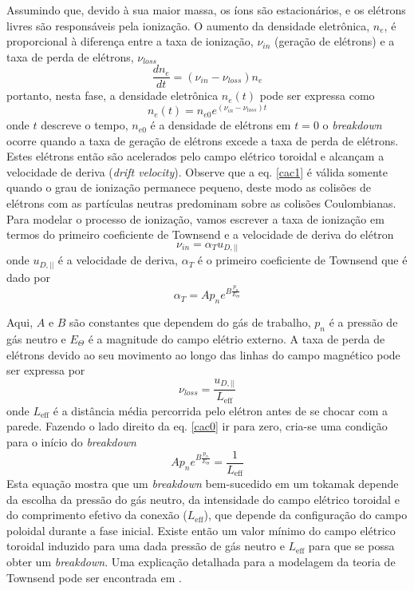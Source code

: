 \documentclass[12pt,oneside,a4paper]{abntex2}
\begin{document}
Assumindo que, devido à sua maior massa, os íons são estacionários, e os elétrons livres são responsáveis pela ionização.  O aumento da densidade eletrônica, $n_e$, é proporcional à diferença entre a taxa de ionização, $\nu_{in}$ (geração de elétrons) e a taxa de perda de elétrons, $\nu_{loss}$
\begin{equation}
\dfrac{dn_e}{dt} = (\nu_{in}-\nu_{loss})n_e
\label{cac0}
\end{equation}
portanto, nesta fase, a densidade eletrônica $n_e(t)$ pode ser expressa como
\begin{equation}
n_e(t) = n_{e0} e^{(\nu_{in}-\nu_{loss})t}
\label{cac1}
\end{equation}
onde $t$ descreve o tempo, $n_{e0}$ é a densidade de elétrons em $t=0$ o \textit{breakdown} ocorre quando a taxa de geração de elétrons excede a taxa de perda de elétrons. Estes elétrons então são acelerados pelo campo elétrico toroidal e alcançam a velocidade de deriva (\textit{drift velocity}). Observe que a eq. \ref{cac1} é válida somente quando o grau de ionização permanece pequeno, deste modo as colisões de elétrons com as partículas neutras predominam sobre as colisões Coulombianas. Para modelar o processo de ionização, vamos escrever a taxa de ionização em termos do primeiro coeficiente de Townsend e a velocidade de deriva do elétron 
\begin{equation}
\nu_{in} = \alpha_T u_{D,||}
\end{equation} 
onde $u_{D, ||}$ é a velocidade de deriva, $\alpha_T$ é o primeiro coeficiente de Townsend que é dado por
\begin{equation}
\alpha_T = A p_n e^{B \frac{p_n}{E_\Theta}}
\end{equation}

Aqui, $A$ e $B$ são constantes que dependem do gás de trabalho, $p_n$ é a pressão de gás neutro e  $E_\Theta$ é a magnitude do campo elétrio externo. A taxa de perda de elétrons devido ao seu movimento ao longo das linhas do campo magnético pode ser expressa por
\begin{equation}
\nu_{loss} = \frac{u_{D,||}}{L_{\mathrm{eff}}}
\end{equation}
onde $L_{\mathrm{eff}}$ é a distância média percorrida pelo elétron antes de se chocar com a parede. Fazendo o lado direito da eq. \ref{cac0} ir para zero, cria-se uma condição para o início do \textit{breakdown}
\begin{equation}
A p_n e^{B \frac{p_n}{E_\Theta}} = \frac{1}{L_{\mathrm{eff}}}
\end{equation}
Esta equação mostra que um \textit{breakdown} bem-sucedido em um tokamak depende da escolha da pressão do gás neutro, da intensidade do campo elétrico toroidal e do comprimento efetivo da conexão ($L_{\mathrm{eff}}$), que depende da configuração do campo poloidal durante a fase inicial. Existe então um valor mínimo do campo elétrico toroidal induzido para uma dada pressão de gás neutro e $L_{\mathrm{eff}}$ para que se possa obter um \textit{breakdown}. Uma explicação detalhada para a modelagem da teoria de Townsend pode ser encontrada em \cite{yoo2014ohmic}.
 
\end{document}
